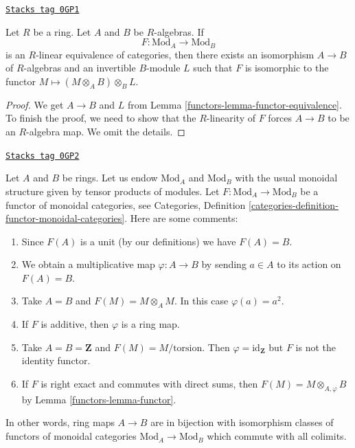\begin{lemma}
\label{functors-lemma-functor-equivalence-linear}
\href{https://stacks.math.columbia.edu/tag/0GP1}{\texttt{Stacks tag 0GP1}}

Let $R$ be a ring. Let $A$ and $B$ be $R$-algebras. If
$$
F : \text{Mod}_A \longrightarrow \text{Mod}_B
$$
is an $R$-linear equivalence of categories, then there exists an isomorphism
$A \to B$ of $R$-algebras and an invertible $B$-module $L$ such that
$F$ is isomorphic to the functor $M \mapsto (M \otimes_A B) \otimes_B L$.
\end{lemma}

\begin{proof}

We get $A \to B$ and $L$ from Lemma \ref{functors-lemma-functor-equivalence}.
To finish the proof, we need to show that the $R$-linearity
of $F$ forces $A \to B$ to be an $R$-algebra map. We omit the details.
\end{proof}

\begin{remark}[Monoidal]
\label{functors-remark-monoidal}
\href{https://stacks.math.columbia.edu/tag/0GP2}{\texttt{Stacks tag 0GP2}}

Let $A$ and $B$ be rings. Let us endow $\text{Mod}_A$ and $\text{Mod}_B$
with the usual monoidal structure given by tensor products of modules.
Let $F : \text{Mod}_A \to \text{Mod}_B$ be a functor of
monoidal categories, see
Categories, Definition \ref{categories-definition-functor-monoidal-categories}.
Here are some comments:
\begin{enumerate}
\item Since $F(A)$ is a unit (by our definitions) we have $F(A) = B$.
\item We obtain a multiplicative map $\varphi : A \to B$
by sending $a \in A$ to its action on $F(A) = B$.
\item Take $A = B$ and $F(M) = M \otimes_A M$. In this case $\varphi(a) = a^2$.
\item If $F$ is additive, then $\varphi$ is a ring map.
\item Take $A = B = \mathbf{Z}$ and $F(M) = M/\text{torsion}$. Then
$\varphi = \text{id}_\mathbf{Z}$ but $F$ is not the identity functor.
\item If $F$ is right exact and commutes with direct sums,
then $F(M) = M \otimes_{A, \varphi} B$ by Lemma \ref{functors-lemma-functor}.
\end{enumerate}
In other words, ring maps $A \to B$ are in bijection with isomorphism classes
of functors of monoidal categories $\text{Mod}_A \to \text{Mod}_B$
which commute with all colimits.
\end{remark}

